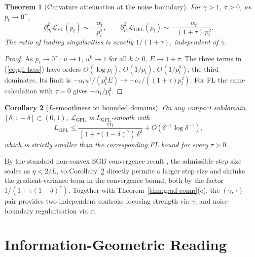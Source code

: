 \documentclass[conference]{IEEEtran}
\newtheorem{theorem}{Theorem}
\newtheorem{corollary}[theorem]{Corollary}
\theoremstyle{definition}
\newcommand{\LFL}{\mathcal{L}_{\mathrm{FL}}}
\newcommand{\LGFL}{\mathcal{L}_{\mathrm{GFL}}}
\begin{document}
\begin{theorem}[Curvature attenuation at the noise boundary]\label{thm:curvature}
For $\gamma > 1$, $\tau > 0$, as $p_t \to 0^+$,
\[
\partial^2_{p_t}\LFL(p_t) \sim -\frac{\alpha_t}{p_t^2}, \qquad
\partial^2_{p_t}\LGFL(p_t) \sim -\frac{\alpha_t}{(1+\tau)\,p_t^2}.
\]
The ratio of leading singularities is exactly $1/(1+\tau)$, independent of $\gamma$.
\end{theorem}
\begin{proof}
As $p_t \to 0^+$: $u \to 1$, $u^k \to 1$ for all $k \ge 0$, $E \to 1+\tau$. The three terms in (\ref{eq:gfl-hess}) have orders $\Theta(\log p_t)$, $\Theta(1/p_t)$, $\Theta(1/p_t^2)$; the third dominates. Its limit is $-\alpha_t u^\gamma/(p_t^2 E) \to -\alpha_t/((1+\tau)p_t^2)$. For FL the same calculation with $\tau = 0$ gives $-\alpha_t/p_t^2$.
\end{proof}

\begin{corollary}[$L$-smoothness on bounded domains]\label{cor:smoothness}
On any compact subdomain $[\delta, 1{-}\delta] \subset (0,1)$, $\LGFL$ is $L_{\mathrm{GFL}}$-smooth with
\[
L_{\mathrm{GFL}} \le \frac{\alpha_t}{(1+\tau(1-\delta)^\gamma)\,\delta^2} + O(\delta^{-1}\log\delta^{-1}),
\]
which is strictly smaller than the corresponding FL bound for every $\tau > 0$.
\end{corollary}

By the standard non-convex SGD convergence result \cite{nesterov2018}, the admissible step size scales as $\eta < 2/L$, so Corollary~\ref{cor:smoothness} directly permits a larger step size and shrinks the gradient-variance term in the convergence bound, both by the factor $1/(1+\tau(1-\delta)^\gamma)$. Together with Theorem~\ref{thm:grad-comp}(c), the $(\gamma,\tau)$ pair provides two independent controls: focusing strength via $\gamma$, and noise-boundary regularisation via $\tau$.

\section{Information-Geometric Reading}
\label{sec:info}
\end{document}
